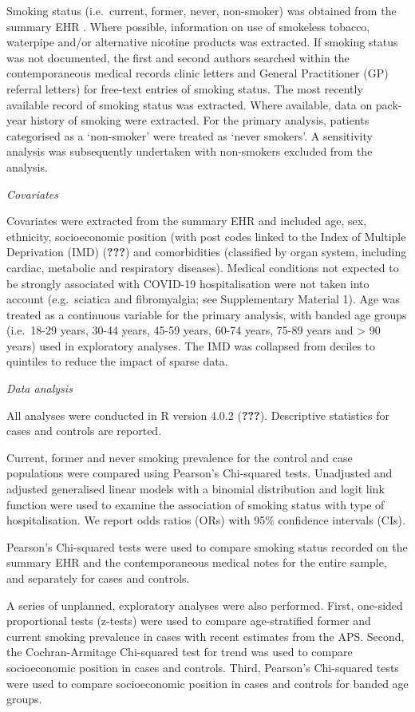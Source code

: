 \documentclass[
]{article}
\begin{document}
Smoking status (i.e.~current, former, never, non-smoker) was obtained
from the summary EHR . Where possible, information on use of smokeless
tobacco, waterpipe and/or alternative nicotine products was extracted.
If smoking status was not documented, the first and second authors
searched within the contemporaneous medical records clinic letters and
General Practitioner (GP) referral letters) for free-text entries of
smoking status. The most recently available record of smoking status was
extracted. Where available, data on pack-year history of smoking were
extracted. For the primary analysis, patients categorised as a
`non-smoker' were treated as `never smokers'. A sensitivity analysis was
subsequently undertaken with non-smokers excluded from the analysis.

\emph{Covariates}

Covariates were extracted from the summary EHR and included age, sex,
ethnicity, socioeconomic position (with post codes linked to the Index
of Multiple Deprivation (IMD) ({\textbf{???}}) and comorbidities
(classified by organ system, including cardiac, metabolic and
respiratory diseases). Medical conditions not expected to be strongly
associated with COVID-19 hospitalisation were not taken into account
(e.g.~sciatica and fibromyalgia; see Supplementary Material 1). Age was
treated as a continuous variable for the primary analysis, with banded
age groups (i.e.~18-29 years, 30-44 years, 45-59 years, 60-74 years,
75-89 years and \textgreater{} 90 years) used in exploratory analyses.
The IMD was collapsed from deciles to quintiles to reduce the impact of
sparse data.

\emph{Data analysis}

All analyses were conducted in R version 4.0.2 ({\textbf{???}}).
Descriptive statistics for cases and controls are reported.

Current, former and never smoking prevalence for the control and case
populations were compared using Pearson's Chi-squared tests. Unadjusted
and adjusted generalised linear models with a binomial distribution and
logit link function were used to examine the association of smoking
status with type of hospitalisation. We report odds ratios (ORs) with
95\% confidence intervals (CIs).

Pearson's Chi-squared tests were used to compare smoking status recorded
on the summary EHR and the contemporaneous medical notes for the entire
sample, and separately for cases and controls.

A series of unplanned, exploratory analyses were also performed. First,
one-sided proportional tests (z-tests) were used to compare
age-stratified former and current smoking prevalence in cases with
recent estimates from the APS. Second, the Cochran-Armitage Chi-squared
test for trend was used to compare socioeconomic position in cases and
controls. Third, Pearson's Chi-squared tests were used to compare
socioeconomic position in cases and controls for banded age groups.
\end{document}

